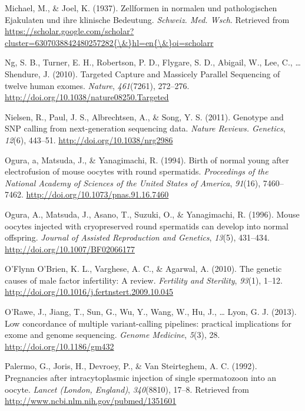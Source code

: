 \documentclass[12pt,twoside]{reedthesis}
\theoremstyle{definition}
\theoremstyle{definition}
\theoremstyle{remark}
\begin{document}
  \hypertarget{ref-Michael1937}{}
  Michael, M., \& Joel, K. (1937). Zellformen in normalen und
  pathologischen Ejakulaten und ihre klinische Bedeutung. \emph{Schweiz.
  Med. Wsch}. Retrieved from
  \href{https://scholar.google.com/scholar?cluster=6307038842480257282\%7B/\&\%7Dhl=en\%7B/\&\%7Doi=scholarr}{https://scholar.google.com/scholar?cluster=6307038842480257282\{\textbackslash{}\&\}hl=en\{\textbackslash{}\&\}oi=scholarr}
  
  \hypertarget{ref-Ng2010}{}
  Ng, S. B., Turner, E. H., Robertson, P. D., Flygare, S. D., Abigail, W.,
  Lee, C., \ldots{} Shendure, J. (2010). Targeted Capture and Massicely
  Parallel Sequencing of twelve human exomes. \emph{Nature},
  \emph{461}(7261), 272--276.
  \url{http://doi.org/10.1038/nature08250.Targeted}
  
  \hypertarget{ref-Nielsen2011}{}
  Nielsen, R., Paul, J. S., Albrechtsen, A., \& Song, Y. S. (2011).
  Genotype and SNP calling from next-generation sequencing data.
  \emph{Nature Reviews. Genetics}, \emph{12}(6), 443--51.
  \url{http://doi.org/10.1038/nrg2986}
  
  \hypertarget{ref-Ogura1994}{}
  Ogura, a, Matsuda, J., \& Yanagimachi, R. (1994). Birth of normal young
  after electrofusion of mouse oocytes with round spermatids.
  \emph{Proceedings of the National Academy of Sciences of the United
  States of America}, \emph{91}(16), 7460--7462.
  \url{http://doi.org/10.1073/pnas.91.16.7460}
  
  \hypertarget{ref-Kimura1995}{}
  Ogura, A., Matsuda, J., Asano, T., Suzuki, O., \& Yanagimachi, R.
  (1996). Mouse oocytes injected with cryopreserved round spermatids can
  develop into normal offspring. \emph{Journal of Assisted Reproduction
  and Genetics}, \emph{13}(5), 431--434.
  \url{http://doi.org/10.1007/BF02066177}
  
  \hypertarget{ref-OFlynnOBrien2010}{}
  O'Flynn O'Brien, K. L., Varghese, A. C., \& Agarwal, A. (2010). The
  genetic causes of male factor infertility: A review. \emph{Fertility and
  Sterility}, \emph{93}(1), 1--12.
  \url{http://doi.org/10.1016/j.fertnstert.2009.10.045}
  
  \hypertarget{ref-ORawe2013}{}
  O'Rawe, J., Jiang, T., Sun, G., Wu, Y., Wang, W., Hu, J., \ldots{} Lyon,
  G. J. (2013). Low concordance of multiple variant-calling pipelines:
  practical implications for exome and genome sequencing. \emph{Genome
  Medicine}, \emph{5}(3), 28. \url{http://doi.org/10.1186/gm432}
  
  \hypertarget{ref-Palermo1992}{}
  Palermo, G., Joris, H., Devroey, P., \& Van Steirteghem, A. C. (1992).
  Pregnancies after intracytoplasmic injection of single spermatozoon into
  an oocyte. \emph{Lancet (London, England)}, \emph{340}(8810), 17--8.
  Retrieved from \url{http://www.ncbi.nlm.nih.gov/pubmed/1351601}
  
\end{document}
